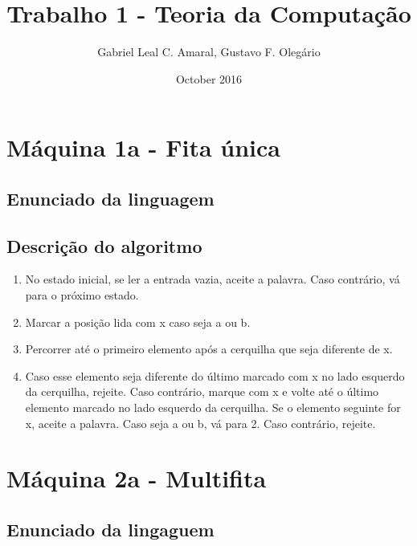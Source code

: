\documentclass{article}
\title{Trabalho 1 - Teoria da Computação}
\author{Gabriel Leal C. Amaral, Gustavo F. Olegário}
\date{October 2016}
\begin{document}
\maketitle
\section{Máquina 1a - Fita única}
    \subsection{Enunciado da linguagem}
    \subsection{Descrição do algoritmo}
        \begin{enumerate}
        \item No estado inicial, se ler a entrada vazia, aceite a palavra. Caso contrário, vá para o próximo estado.
        \item Marcar a posição lida com x caso seja a ou b.
        \item Percorrer até o primeiro elemento após a cerquilha que seja diferente de x.
        \item Caso esse elemento seja diferente do último marcado com x no lado esquerdo da cerquilha, rejeite. Caso contrário, marque com x e volte até o último elemento marcado no lado esquerdo da cerquilha. Se o elemento seguinte for x, aceite a palavra. Caso seja a ou b, vá para 2. Caso contrário, rejeite.
        \end{enumerate}
\section{Máquina 2a - Multifita}
    \subsection{Enunciado da lingaguem}
\end{document}
